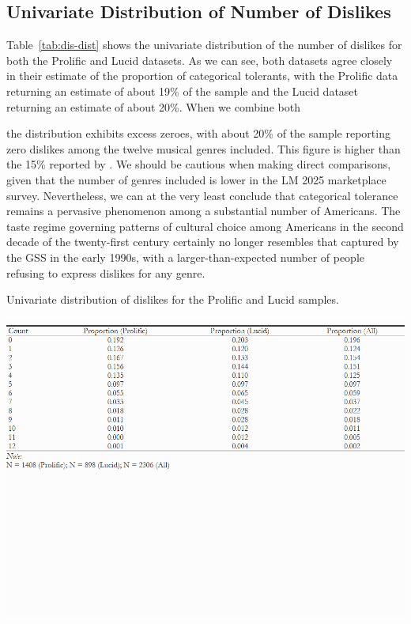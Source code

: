 \documentclass[12pt]{article}
\begin{document}
\subsection*{Univariate Distribution of Number of Dislikes}
Table~\ref{tab:dis-dist} shows the univariate distribution of the number of dislikes for both the Prolific and Lucid datasets. As we can see, both datasets agree closely in their estimate of the proportion of categorical tolerants, with the Prolific data returning an estimate of about 19\% of the sample and the Lucid dataset returning an estimate of about 20\%. When we combine both

the distribution exhibits excess zeroes, with about 20\% of the sample reporting zero dislikes among the twelve musical genres included. This figure is higher than the 15\% reported by \citet{lizardo2016end-4fb}. We should be cautious when making direct comparisons, given that the number of genres included is lower in the LM 2025 marketplace survey. Nevertheless, we can at the very least conclude that categorical tolerance remains a pervasive phenomenon among a substantial number of Americans. The taste regime governing patterns of cultural choice among Americans in the second decade of the twenty-first century certainly no longer resembles that captured by the GSS in the early 1990s, with a larger-than-expected number of people refusing to express dislikes for any genre. 

\begin{table}[ht!]
    \caption{Univariate distribution of dislikes for the Prolific and Lucid samples.}
    \includegraphics[trim={0 11cm 0 0},clip, width=1.0\textwidth]{Tabs/desc-tab-dislike-dist.png}
    \label{tab:dis-dist}
\end{table}
\end{document}
